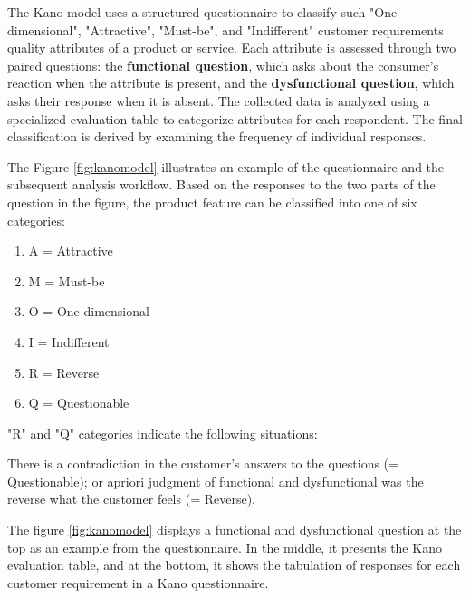 \documentclass[../main.tex]{subfiles}
\begin{document}
The Kano model uses a structured questionnaire to classify such "One-dimensional", "Attractive", "Must-be", and "Indifferent" customer requirements quality attributes of a product or service. Each attribute is assessed through two paired questions: the \textbf{functional question}, which asks about the consumer’s reaction when the attribute is present, and the \textbf{dysfunctional question}, which asks their response when it is absent. The collected data is analyzed using a specialized evaluation table to categorize attributes for each respondent. The final classification is derived by examining the frequency of individual responses. \cite{kanomodel1996}

The Figure \ref{fig:kanomodel} illustrates an example of the questionnaire and the subsequent analysis workflow. Based on the responses to the two parts of the question in the figure, the product feature can be classified into one of six categories:

\begin{enumerate}
    \item[] A = Attractive 
    \item[] M = Must-be 
    \item[] O = One-dimensional 
    \item[] I = Indifferent 
    \item[] R = Reverse
    \item[] Q = Questionable 
\end{enumerate}

"R" and "Q" categories indicate the following situations: 

There is a contradiction in the customer’s answers to the questions (= Questionable); or apriori judgment of functional and dysfunctional was the reverse what the customer feels (= Reverse). \cite{berger1993kano}

The figure \ref{fig:kanomodel} displays a functional and dysfunctional question at the top as an example from the questionnaire. In the middle, it presents the Kano evaluation table, and at the bottom, it shows the tabulation of responses for each customer requirement in a Kano questionnaire.
\end{document}
